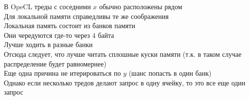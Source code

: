 \documentclass[12pt]{article}
\begin{document}
В OpeCL треды с соседними $x$ обычно расположены рядом\\
Для локальной памяти справедливы те же соображения\\
Локальная память состоит из банков памяти\\
Они чередуются где-то через 4 байта\\
Лучше ходить в разные банки\\
Отсюда следует, что лучше читать сплошные куски памяти (т.к. в таком случае распределение будет равномернее)\\
Еще одна причина не итерироваться по $y$ (шанс попасть в один банк)\\
Однако если несколько тредов делают запрос в одну ячейку, то это все еще один запрос\\
\end{document}
